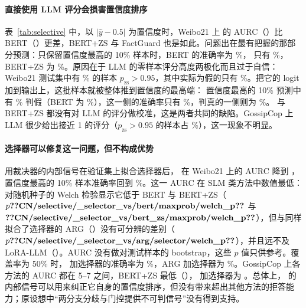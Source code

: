\paragraph{直接使用 LLM 评分会损害置信度排序}
表~\ref{tab:selective} 中，以 $|\hat y-0.5|$ 为置信度时，Weibo21 上 \method{} 的 AURC（）比 BERT（）更差，BERT+ZS 与 FactGuard 也是如此。问题出在最有把握的那部分预测：只保留置信度最高的 10\% 样本时，BERT 的准确率为 \%，\method{} 只有 \%，BERT+ZS 为 \%。原因在于 LLM 的零样本评分高度两极化而且过于自信：Weibo21 测试集中有 \% 的样本 $p_{\mathrm{zs}}>0.95$，其中实际为假的只有 \%。把它的 logit 加到输出上，这批样本就被整体推到置信度的最高端：\method{} 置信度最高的 10\% 预测中有 \% 判假（BERT 为 \%），这一侧的准确率只有 \%，判真的一侧则为 \%。\method{} 与 BERT+ZS 都没有对 LLM 的评分做校准，这是两者共同的缺陷。GossipCop 上 LLM 很少给出接近 1 的评分（$p_{\mathrm{zs}}>0.95$ 的样本占 \%），这一现象不明显。

\paragraph{选择器可以修复这一问题，但不构成优势}
用裁决器的内部信号在验证集上拟合选择器后，\method{} 在 Weibo21 上的 AURC 降到 ，置信度最高的 10\% 样本准确率回到 \%。这一 AURC 在 SLM 类方法中数值最低：对随机种子的 Welch 检验显示它低于 BERT 与 BERT+ZS（$p\peq{CN/selective/_selector_vs/bert/maxprob/welch_p}$ 与 $\fthree{CN/selective/_selector_vs/bert_zs/maxprob/welch_p}$），但与同样拟合了选择器的 ARG（）没有可分辨的差别（$p\peq{CN/selective/_selector_vs/arg/selector/welch_p}$），并且远不及 LoRA-LLM（）。AURC 没有做对测试样本的 bootstrap，这些 $p$ 值只供参考。覆盖率为 50\% 时，\method{} 加选择器的准确率为 \%，ARG 加选择器为 \%。GossipCop 上各方法的 AURC 都在 5--7 之间，BERT+ZS 最低（），\method{} 加选择器为 。总体上，\method{} 的内部信号可以用来纠正它自身的置信度排序，但没有带来超出其他方法的拒答能力；原设想中“两分支分歧与门控提供不可判信号”没有得到支持。

